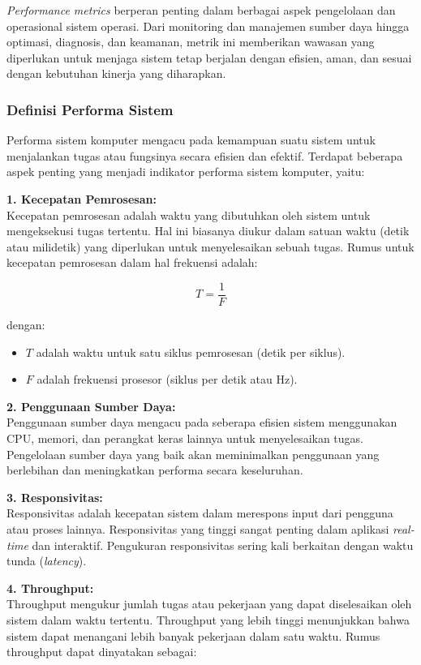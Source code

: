 \documentclass[12pt]{article}
\begin{document}
\hspace*{1cm} \textit{Performance metrics} berperan penting dalam berbagai aspek pengelolaan dan operasional sistem operasi. Dari monitoring dan manajemen sumber daya hingga optimasi, diagnosis, dan keamanan, metrik ini memberikan wawasan yang diperlukan untuk menjaga sistem tetap berjalan dengan efisien, aman, dan sesuai dengan kebutuhan kinerja yang diharapkan.

\subsubsection{Definisi Performa Sistem}

Performa sistem komputer mengacu pada kemampuan suatu sistem untuk menjalankan tugas atau fungsinya secara efisien dan efektif. Terdapat beberapa aspek penting yang menjadi indikator performa sistem komputer, yaitu:

\textbf{1. Kecepatan Pemrosesan:} \\
Kecepatan pemrosesan adalah waktu yang dibutuhkan oleh sistem untuk mengeksekusi tugas tertentu. Hal ini biasanya diukur dalam satuan waktu (detik atau milidetik) yang diperlukan untuk menyelesaikan sebuah tugas. Rumus untuk kecepatan pemrosesan dalam hal frekuensi adalah:

\[
T = \frac{1}{F}
\]

dengan:
\begin{itemize}
    \item $T$ adalah waktu untuk satu siklus pemrosesan (detik per siklus).
    \item $F$ adalah frekuensi prosesor (siklus per detik atau Hz).
\end{itemize}

\textbf{2. Penggunaan Sumber Daya:} \\
Penggunaan sumber daya mengacu pada seberapa efisien sistem menggunakan CPU, memori, dan perangkat keras lainnya untuk menyelesaikan tugas. Pengelolaan sumber daya yang baik akan meminimalkan penggunaan yang berlebihan dan meningkatkan performa secara keseluruhan.

\textbf{3. Responsivitas:} \\
Responsivitas adalah kecepatan sistem dalam merespons input dari pengguna atau proses lainnya. Responsivitas yang tinggi sangat penting dalam aplikasi \textit{real-time} dan interaktif. Pengukuran responsivitas sering kali berkaitan dengan waktu tunda (\textit{latency}).

\textbf{4. Throughput:} \\
Throughput mengukur jumlah tugas atau pekerjaan yang dapat diselesaikan oleh sistem dalam waktu tertentu. Throughput yang lebih tinggi menunjukkan bahwa sistem dapat menangani lebih banyak pekerjaan dalam satu waktu. Rumus throughput dapat dinyatakan sebagai:
\end{document}
